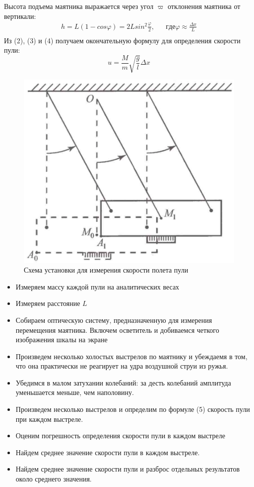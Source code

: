 \documentclass[a4paper,12pt]{article} %
\begin{document}
Высота подъема маятника выражается через угол $\varpi$ отклонения маятника от вертикали:
\begin{equation}
\begin{aligned}
h = L(1-cos\varphi) = 2Lsin^2\frac{\varphi}{2}, & & где \varphi\approx\frac{\Delta x}{L}\\
\end{aligned}
\end{equation}
Из (2), (3) и (4) получаем окончательную формулу для определения скорости пули:
\begin{equation}
u = \frac{M}{m}\sqrt{\frac{g}{l}}\Delta x
\end{equation}
\begin{figure}[h]
\centering
\includegraphics[scale = 0.4]{2}
\caption{Схема установки для измерения скорости полета пули}
\end{figure}
\begin{itemize}
\item Измеряем массу каждой пули на аналитических весах
\item Измеряем расстояние $L$
\item Собираем оптическую систему, предназначенную для измерения перемещения маятника. Включем осветитель и добиваемся четкого изображения шкалы на экране
\item Произведем несколько холостых выстрелов по маятнику и убеждаемя в том, что она практически не реагирует на удра воздушной струи из ружья.
\item Убедимся в малом затухании колебаний: за десть колебаний амплитуда уменьшается меньше, чем наполовину.
\item Произведем несколько выстрелов и определим по формуле (5) скорость пули при каждом выстреле.
\item Оценим погрешность определения скорости пули в каждом выстреле
\item Найдем среднее значение скорости пули в каждом выстреле.
\item Найдем среднее значение скорости пули и разброс отдельных результатов около среднего значения. 
\end{itemize}
\end{document}
